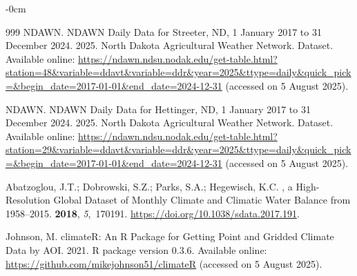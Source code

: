 \documentclass[fire,article,accept,oneauthor,pdftex]{Definitions/mdpi}
\begin{document}
\begin{adjustwidth}{-\extralength}{0cm}
\begin{thebibliography}{999}
{NDAWN}.
\newblock NDAWN Daily Data for Streeter, ND, 1 January 2017 to
  31 December 2024.  2025. 
\newblock North Dakota Agricultural Weather Network. Dataset. 
\newblock Available online: \url{https://ndawn.ndsu.nodak.edu/get-table.html?station=48&variable=ddavt&variable=ddr&year=2025&ttype=daily&quick_pick=&begin_date=2017-01-01&end_date=2024-12-31} (accessed on 5 August 2025).


{NDAWN}.
\newblock NDAWN Daily Data for Hettinger, ND, 1 January 2017
  to 31 December 2024.  2025.
\newblock North Dakota Agricultural Weather Network. Dataset. 
\newblock Available online: \url{https://ndawn.ndsu.nodak.edu/get-table.html?station=29&variable=ddavt&variable=ddr&year=2025&ttype=daily&quick_pick=&begin_date=2017-01-01&end_date=2024-12-31} (accessed on 5 August 2025).

Abatzoglou, J.T.; Dobrowski, S.Z.; Parks, S.A.; Hegewisch, K.C.
, a High-Resolution Global Dataset of Monthly Climate
  and Climatic Water Balance from 1958--2015.
 {\bf 2018}, {\em 5},~170191.
\newblock
  \url{https://doi.org/10.1038/sdata.2017.191}.

Johnson, M.
\newblock climateR: An R Package for Getting Point and Gridded Climate
  Data by AOI.  2021.
\newblock R package version 0.3.6. 
\newblock Available online: \url{https://github.com/mikejohnson51/climateR} (accessed on 5 August 2025).



\end{thebibliography}
\end{adjustwidth}
\end{document}
